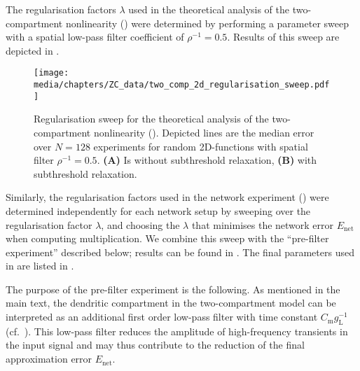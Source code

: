 The regularisation factors $\lambda$ used in the theoretical analysis of the two-compartment \LIF nonlinearity () were determined by performing a parameter sweep with a spatial low-pass filter coefficient of $\rho^{-1} = 0.5$.
Results of this sweep are depicted in .
\begin{figure}
	\centering
	\texttt{[image: media/chapters/ZC\_data/two\_comp\_2d\_regularisation\_sweep.pdf]}
	\caption[Regularisation sweep for the theoretical analysis of the two-compartment LIF nonlinearity]{Regularisation sweep for the theoretical analysis of the two-compartment \LIF nonlinearity (). Depicted lines are the median error over $N=128$ experiments for random 2D-functions with spatial filter $\rho^{-1} = 0.5$.
	\textbf{(A)} Is without subthreshold relaxation, \textbf{(B)} with subthreshold relaxation.}
	\label{fig:two_comp_2d_regularisation_sweep}
\end{figure}

Similarly, the regularisation factors used in the network experiment () were determined independently for each network setup by sweeping over the regularisation factor $\lambda$, and choosing the $\lambda$ that minimises the network error $E_\mathrm{net}$ when computing multiplication.
We combine this sweep with the \enquote{pre-filter experiment} described below; results can be found in .
The final parameters used in  are listed in .

The purpose of the pre-filter experiment is the following.
As mentioned in the main text, the dendritic compartment in the two-compartment model can be interpreted as an additional first order low-pass filter with time constant $C_\mathrm{m} g_\mathrm{L}^{-1}$ (cf.~).
This low-pass filter reduces the amplitude of high-frequency transients in the input signal and may thus contribute to the reduction of the final approximation error $E_\mathrm{net}$.

